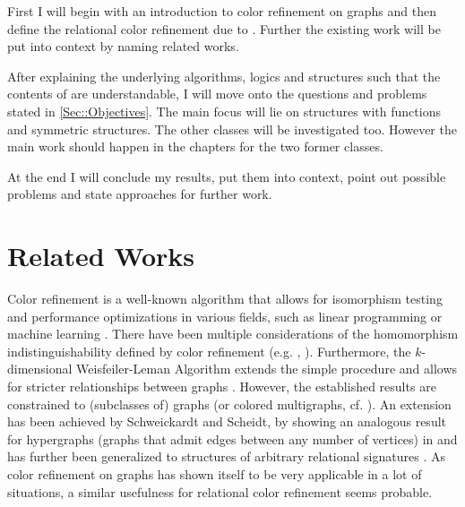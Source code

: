 \documentclass[a4paper,11pt,DIV=15]{scrartcl} %
\theoremstyle{plain}
\theoremstyle{definition}
\begin{document}
First I will begin with an introduction to color refinement on graphs and then define the relational color refinement due to \cite{scheidt2024color}.
Further the existing work will be put into context by naming related works.

After explaining the underlying algorithms, logics and structures such that the contents of \cite{scheidt2024color} are understandable, I will move onto the questions and problems stated in \cref{Sec::Objectives}.
The main focus will lie on structures with functions and symmetric structures.
The other classes will be investigated too. However the main work should happen in the chapters for the two former classes.

At the end I will conclude my results, put them into context, point out possible problems and state approaches for further work.


\section{Related Works}

Color refinement is a well-known algorithm that allows for isomorphism testing and performance optimizations in various fields, such as linear programming or machine learning \cite{grohe2021color}.
There have been multiple considerations of the homomorphism indistinguishability defined by color refinement (e.g. \cite{fluck2023going}, \cite{manvcinska2020quantum}).
Furthermore, the $k$-dimensional Weisfeiler-Leman Algorithm extends the simple procedure and allows for stricter relationships between graphs \cite{kiefer2020power}.
However, the established results are constrained to (subclasses of) graphs (or colored multigraphs, cf. \cite{dell2018lov}).
An extension has been achieved by Schweickardt and Scheidt, by showing an analogous result for hypergraphs (graphs that admit edges between any number of vertices) in \cite{scheidt2023counting} and has further been generalized to structures of arbitrary relational signatures \cite{scheidt2024color}.
As color refinement on graphs has shown itself to be very applicable in a lot of situations, a similar usefulness for relational color refinement seems probable.




\end{document}
